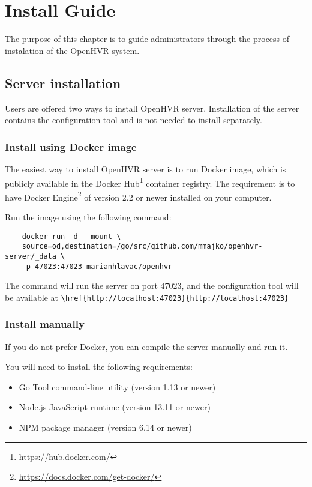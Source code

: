 \chapter{Install Guide}\label{installguide}

The purpose of this chapter is to guide administrators through the process
of instalation of the OpenHVR system.

\section*{Server installation}

Users are offered two ways to install OpenHVR server. Installation of the
server contains the configuration tool and is not needed to install separately.

\subsection*{Install using Docker image}

The easiest way to install OpenHVR server is to run Docker image, which is
publicly available in the Docker Hub\footnote{\href{https://hub.docker.com/}{https://hub.docker.com/}}
container registry. The requirement is to have Docker 
Engine\footnote{\href{https://docs.docker.com/get-docker/}{https://docs.docker.com/get-docker/}} of version 2.2 or
newer installed on your computer. 

Run the image using the following command:

\begin{verbatim}
    docker run -d --mount \
    source=od,destination=/go/src/github.com/mmajko/openhvr-server/_data \
    -p 47023:47023 marianhlavac/openhvr
\end{verbatim}

The command will run the server on port 47023, and the configuration tool will
be available at \verb|\href{http://localhost:47023}{http://localhost:47023}|

\subsection*{Install manually}

If you do not prefer Docker, you can compile the server manually and run it.

You will need to install the following requirements:

\begin{itemize}
    \itemsep0em
    \item Go Tool command-line utility (version 1.13 or newer)
    \item Node.js JavaScript runtime (version 13.11 or newer) 
    \item NPM package manager (version 6.14 or newer)
\end{itemize}


